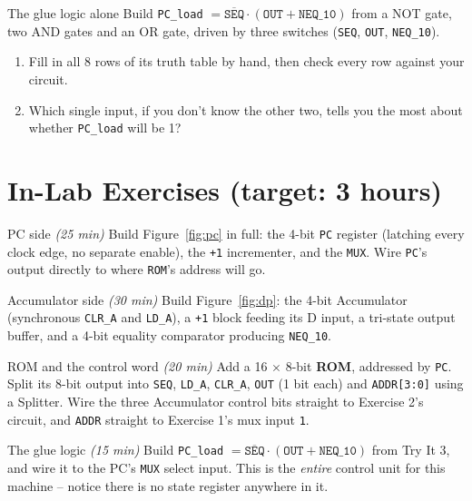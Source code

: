 \documentclass[11pt]{article}
\begin{document}
\begin{tryit}{The glue logic alone}
Build \texttt{PC\_load} $= \overline{\texttt{SEQ}} \cdot (\texttt{OUT} +
\texttt{NEQ\_10})$ from a NOT gate, two AND gates and an OR gate, driven by three
switches (\texttt{SEQ}, \texttt{OUT}, \texttt{NEQ\_10}).
\begin{enumerate}[nosep,leftmargin=*]
  \item Fill in all 8 rows of its truth table by hand, then check every row against
        your circuit.
  \item Which single input, if you don't know the other two, tells you the most
        about whether \texttt{PC\_load} will be 1?
\end{enumerate}
\end{tryit}

\section*{In-Lab Exercises (target: 3 hours)}

\begin{labexercise}{PC side \hfill {\small \itshape (25 min)}}
Build Figure~\ref{fig:pc} in full: the 4-bit \texttt{PC} register (latching every
clock edge, no separate enable), the \texttt{+1} incrementer, and the \texttt{MUX}.
Wire \texttt{PC}'s output directly to where \texttt{ROM}'s address will go.
\end{labexercise}

\begin{labexercise}{Accumulator side \hfill {\small \itshape (30 min)}}
Build Figure~\ref{fig:dp}: the 4-bit Accumulator (synchronous \texttt{CLR\_A} and
\texttt{LD\_A}), a \texttt{+1} block feeding its D input, a tri-state output buffer,
and a 4-bit equality comparator producing \texttt{NEQ\_10}.
\end{labexercise}

\begin{labexercise}{ROM and the control word \hfill {\small \itshape (20 min)}}
Add a 16 $\times$ 8-bit \textbf{ROM}, addressed by \texttt{PC}. Split its 8-bit
output into \texttt{SEQ}, \texttt{LD\_A}, \texttt{CLR\_A}, \texttt{OUT} (1 bit each)
and \texttt{ADDR[3:0]} using a Splitter. Wire the three Accumulator control bits
straight to Exercise 2's circuit, and \texttt{ADDR} straight to Exercise 1's mux
input \texttt{1}.
\end{labexercise}

\begin{labexercise}{The glue logic \hfill {\small \itshape (15 min)}}
Build \texttt{PC\_load} $= \overline{\texttt{SEQ}} \cdot (\texttt{OUT} +
\texttt{NEQ\_10})$ from Try It 3, and wire it to the PC's \texttt{MUX} select
input. This is the \emph{entire} control unit for this machine -- notice there is
no state register anywhere in it.
\end{labexercise}
\end{document}
